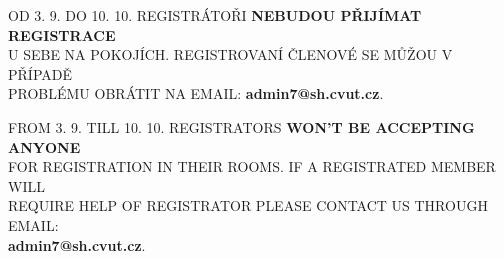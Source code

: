 \documentclass[12pt,a4paper]{article}
\begin{document}
    OD 3. 9. DO 10. 10. REGISTRÁTOŘI \textbf{NEBUDOU PŘIJÍMAT REGISTRACE} \\ U SEBE NA POKOJÍCH. REGISTROVANÍ ČLENOVÉ
    SE MŮŽOU V PŘÍPADĚ \\ PROBLÉMU OBRÁTIT NA EMAIL: \textbf{admin7@sh.cvut.cz}.

    \vspace{1em}

    FROM 3. 9. TILL 10. 10. REGISTRATORS \textbf{WON'T BE ACCEPTING ANYONE} \\ FOR REGISTRATION IN THEIR ROOMS. IF A 
    REGISTRATED MEMBER WILL \\ REQUIRE HELP OF REGISTRATOR PLEASE CONTACT US THROUGH EMAIL: \\ 
    \textbf{admin7@sh.cvut.cz}.

    \begin{flushright}
        \vfill
        
    \end{flushright}
\end{document}
